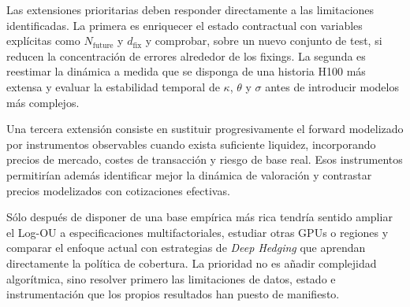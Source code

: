 Las extensiones prioritarias deben responder directamente a las limitaciones identificadas. La primera es enriquecer el estado contractual con variables explícitas como $N_{\mathrm{future}}$ y $d_{\mathrm{fix}}$ y comprobar, sobre un nuevo conjunto de test, si reducen la concentración de errores alrededor de los fixings. La segunda es reestimar la dinámica a medida que se disponga de una historia H100 más extensa y evaluar la estabilidad temporal de $\kappa$, $\theta$ y $\sigma$ antes de introducir modelos más complejos.

Una tercera extensión consiste en sustituir progresivamente el forward modelizado por instrumentos observables cuando exista suficiente liquidez, incorporando precios de mercado, costes de transacción y riesgo de base real. Esos instrumentos permitirían además identificar mejor la dinámica de valoración y contrastar precios modelizados con cotizaciones efectivas.

Sólo después de disponer de una base empírica más rica tendría sentido ampliar el Log-OU a especificaciones multifactoriales, estudiar otras GPUs o regiones y comparar el enfoque actual con estrategias de \emph{Deep Hedging} que aprendan directamente la política de cobertura. La prioridad no es añadir complejidad algorítmica, sino resolver primero las limitaciones de datos, estado e instrumentación que los propios resultados han puesto de manifiesto.
